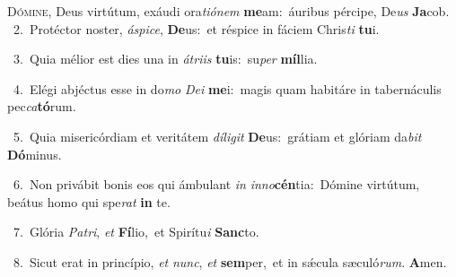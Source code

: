 \lettrine{\initial\textcolor{\initialcolor}{D}}{ómine,} Deus virtútum, exáudi ora\-\textit{ti}\-\textit{ó}\textit{nem} \textbf{me}\-am:~\star áuribus pércipe, De\textit{us} \textbf{Ja}\-cob.\\
{\numbfont\textcolor{\numbcolor}{~2.}}~Protéctor noster, \textit{á}\-\textit{spi}\textit{ce}, \textbf{De}\-us:~\star et réspice in fáciem Chris\textit{ti} \textbf{tu}\-i.\par
{\numbfont\textcolor{\numbcolor}{~3.}}~Quia mélior est dies una in \textit{á}\-\textit{tri}\textit{is} \textbf{tu}\-is:~\star su\textit{per} \textbf{míl}\-lia.\par
{\numbfont\textcolor{\numbcolor}{~4.}}~Elégi abjéctus esse in do\textit{mo} \textit{De}\-\textit{i} \textbf{me}\-i:~\star magis quam habitáre in tabernáculis pec\-\textit{ca}\-\textbf{tó}rum.\par
{\numbfont\textcolor{\numbcolor}{~5.}}~Quia misericórdiam et veritátem \textit{dí}\-\textit{li}\textit{git} \textbf{De}\-us:~\star grátiam et glóriam da\textit{bit} \textbf{Dó}\-minus.\par
{\numbfont\textcolor{\numbcolor}{~6.}}~Non privábit bonis eos qui ámbulant \textit{in} \textit{in}\-\textit{no}\textbf{cén}tia:~\star Dómine virtútum, beátus homo qui spe\textit{rat} \textbf{in} te.\par
{\numbfont\textcolor{\numbcolor}{~7.}}~Glória \textit{Pa}\-\textit{tri}, \textit{et} \textbf{Fí}\-lio,~\star et Spirítu\textit{i} \textbf{Sanc}\-to.\par
{\numbfont\textcolor{\numbcolor}{~8.}}~Sicut erat in princípio, \textit{et} \textit{nunc}\-, \textit{et} \textbf{sem}\-per,~\star et in sǽcula sæculó\-\textit{rum}\-. \textbf{A}\-men.\par
